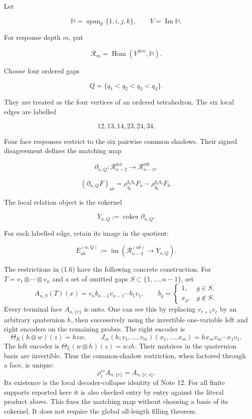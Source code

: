 \documentclass[
  11pt,
  a4paper,
]{article}
\begin{document}
Let

\[
\mathbb H=\operatorname{span}_{\mathbb R}\{1,i,j,k\},
\qquad
V=\operatorname{Im}\mathbb H.
\tag{1.1}
\]

For response depth \(m\), put

\[
\mathcal R_m=\operatorname{Hom}(V^{\otimes m},\mathbb H).
\tag{1.2}
\]

Choose four ordered gaps

\[
Q=\{q_1<q_2<q_3<q_4\}.
\tag{1.3}
\]

They are treated as the four vertices of an ordered tetrahedron. The six
local edges are labelled

\[
12,13,14,23,24,34.
\tag{1.4}
\]

Four face responses restrict to the six pairwise common shadows. Their
signed disagreement defines the matching map

\[
\partial_{n,Q}:
\mathcal R_{n-2}^{\oplus4}
\longrightarrow
\mathcal R_{n-3}^{\oplus6},
\tag{1.5}
\]

\[
(\partial_{n,Q}F)_{ab}
=
\rho_{q_a}^{q_aq_b}F_a
-
\rho_{q_b}^{q_aq_b}F_b.
\tag{1.6}
\]

The local relation object is the cokernel

\[
Y_{n,Q}:=\operatorname{coker}\partial_{n,Q}.
\tag{1.7}
\]

For each labelled edge, retain its image in the quotient:

\[
E_{ab}^{(n,Q)}
:=
\operatorname{im}
\left(
\mathcal R_{n-3}^{(ab)}\longrightarrow Y_{n,Q}
\right).
\tag{1.8}
\]

The restrictions in (1.6) have the following concrete construction. For
\(T=v_1\otimes\cdots\otimes v_n\) and a set of omitted gaps
\(S\subset\{1,\ldots,n-1\}\), set \[
 A_{n,S}(T)(x)=v_n b_{n-1}v_{n-1}\cdots b_1v_1,
 \qquad
 b_g=\begin{cases}1,&g\in S,\\x_g,&g\notin S.\end{cases}
\] Every terminal face \(A_{n,\{r\}}\) is onto. One can see this by
replacing \(v_{r+1}v_r\) by an arbitrary quaternion \(h\), then
successively using the invertible one-variable left and right encoders
on the remaining probes. The right encoder is \[
 \Theta_R(h\otimes w)(z)=hzw,
 \qquad
 J_m(h;v_1,\ldots,v_m)(x_1,\ldots,x_m)
 =h x_m v_m\cdots x_1v_1.
\] The left encoder is \(\Theta_L(w\otimes h)(z)=wzh\). Their matrices
in the quaternion basis are invertible. Thus the common-shadow
restriction, when factored through a face, is unique: \[
 \rho_r^{rs}A_{n,\{r\}}=A_{n,\{r,s\}}.
\] Its existence is the local decoder-collapse identity of Note 12. For
all finite supports reported here it is also checked entry by entry
against the literal product above. This fixes the matching map without
choosing a basis of its cokernel. It does not require the global
all-length filling theorem.
\end{document}
